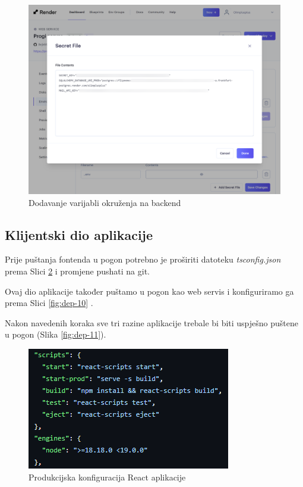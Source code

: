         \begin{figure}[htp]
			\includegraphics[scale=0.17]{slike/deploy_9.png}
			\centering
			\caption{Dodavanje varijabli okruženja na backend}
            \label{fig:dep-9}
		\end{figure}

        \eject

        \subsection{Klijentski dio aplikacije}

        \begin{packed_item}

            \item Prije puštanja fontenda u pogon potrebno je proširiti datoteku \emph{tsconfig.json} prema Slici \ref{fig:dep-10-5} i promjene pushati na git.
            \item Ovaj dio aplikacije također puštamo u pogon kao web servis i konfiguriramo ga prema Slici \ref{fig:dep-10} .
            
        \end{packed_item}

        Nakon navedenih koraka sve tri razine aplikacije trebale bi biti uspješno puštene u pogon (Slika \ref{fig:dep-11}).

        \begin{figure}[htp]
			\includegraphics[scale=1]{slike/deploy_10_5.png}
			\centering
			\caption{Produkcijska konfiguracija React aplikacije}
            \label{fig:dep-10-5}
		\end{figure}

